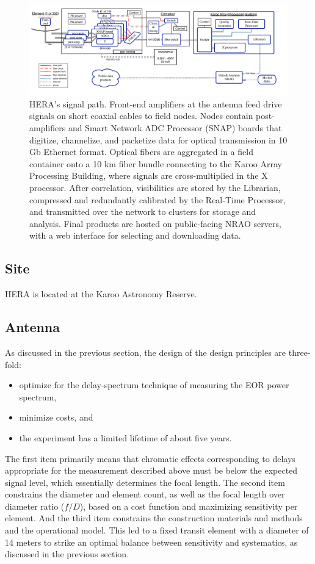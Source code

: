 \documentclass[preprint,11pt]{aastex}
\begin{document}
\begin{figure}[h]
	\centering
	\includegraphics[width=1\textwidth]{plots/HERA_high_level_block_diagram.pdf}
	\caption{HERA's signal path.  Front-end amplifiers at the antenna feed drive signals on short coaxial cables to 
field nodes.  Nodes contain post-amplifiers and Smart Network ADC Processor (SNAP) boards that digitize, channelize,
and packetize data for optical transmission in 10 Gb Ethernet format.  Optical fibers are aggregated in a field container
onto a 10 km fiber bundle connecting to the Karoo Array Processing Building, where signals are cross-multiplied
in the X processor.  After correlation, visibilities are stored by the Librarian, compressed and redundantly calibrated
by the Real-Time Processor, and transmitted over the network to clusters for storage and analysis.  Final products are
hosted on public-facing NRAO servers, with a web interface for selecting and downloading data.}
	\label{fig:overallBlockDiagram}
	\vspace{-5pt}
\end{figure}

\subsection{Site}
\label{sec:site}
HERA is located at the Karoo Astronomy Reserve.

\subsection{Antenna}
\label{sec:antenna}

As discussed in the previous section, the design of the design principles are three-fold:
\begin{itemize}
\item optimize for the delay-spectrum technique of measuring the EOR power spectrum,
\item minimize costs, and
\item the experiment has a limited lifetime of about five years.
\end{itemize}
The first item primarily means that chromatic effects corresponding to delays appropriate for the measurement described above must be below the expected signal level, which essentially determines the focal length.  The second item constrains the diameter and element count, as well as the focal length over diameter ratio ($f/D$), based on a cost function and maximizing sensitivity per element.  And the third item constrains the construction materials and methods and the operational model.  This led to a fixed transit element with a diameter of 14 meters to strike an optimal balance between sensitivity and systematics, as discussed in the previous section.
\end{document}
